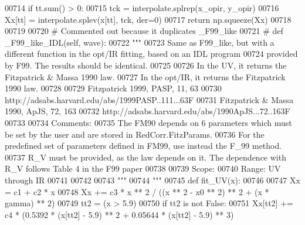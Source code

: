 \begin{DoxyVerb}
\begin{DoxyCode}
00714         \textcolor{keywordflow}{if} tt.sum() > 0:
00715             tck = interpolate.splrep(x\_opir, y\_opir)
00716             Xx[tt] = interpolate.splev(x[tt], tck, der=0)
00717         \textcolor{keywordflow}{return} np.squeeze(Xx)
00718 
00719 
00720 \textcolor{comment}{# Commented out because it duplicates \_F99\_like}
00721 \textcolor{comment}{#    def \_F99\_like\_IDL(self, wave):}
00722         \textcolor{stringliteral}{"""}
00723 \textcolor{stringliteral}{        Same as F99\_like, but with a different function in the opt/IR fitting, based on an IDL program}
00724 \textcolor{stringliteral}{        provided by F99. The results should be identical.}
00725 \textcolor{stringliteral}{    }
00726 \textcolor{stringliteral}{        In the UV, it returns the Fitzpatrick & Massa 1990 law.}
00727 \textcolor{stringliteral}{        In the opt/IR, it returns the Fitzpatrick 1990 law. }
00728 \textcolor{stringliteral}{        }
00729 \textcolor{stringliteral}{        Fitzpatrick 1999, PASP, 11, 63}
00730 \textcolor{stringliteral}{        http://adsabs.harvard.edu/abs/1999PASP..111...63F}
00731 \textcolor{stringliteral}{        Fitzpatrick & Massa 1990, ApJS, 72, 163}
00732 \textcolor{stringliteral}{        http://adsabs.harvard.edu/abs/1990ApJS...72..163F}
00733 \textcolor{stringliteral}{        }
00734 \textcolor{stringliteral}{        Comments:}
00735 \textcolor{stringliteral}{        The FM90 depends on 6 parameters which must be set by the user and are stored in
       RedCorr.FitzParams.}
00736 \textcolor{stringliteral}{        For the predefined set of parameters defined in FM99, use instead the F\_99 method.}
00737 \textcolor{stringliteral}{        R\_V must be provided, as the law depends on it. The dependence with R\_V follows Table 4 in the F99
       paper }
00738 \textcolor{stringliteral}{}
00739 \textcolor{stringliteral}{        Scope:    }
00740 \textcolor{stringliteral}{        Range: UV through IR}
00741 \textcolor{stringliteral}{        }
00742 \textcolor{stringliteral}{        }
00743 \textcolor{stringliteral}{        """}
00744         \textcolor{stringliteral}{"""}
00745 \textcolor{stringliteral}{        def fit\_UV(x):}
00746 \textcolor{stringliteral}{}
00747 \textcolor{stringliteral}{            Xx = c1 + c2 * x}
00748 \textcolor{stringliteral}{            Xx += c3 * x ** 2 / ((x ** 2 - x0 ** 2) ** 2 + (x * gamma) ** 2)}
00749 \textcolor{stringliteral}{            tt2 = (x > 5.9) }
00750 \textcolor{stringliteral}{            if tt2 is not False:}
00751 \textcolor{stringliteral}{                Xx[tt2] += c4 * (0.5392 * (x[tt2] - 5.9) ** 2 + 0.05644 * (x[tt2] - 5.9) ** 3)}

\end{DoxyCode}
\end{DoxyVerb}
